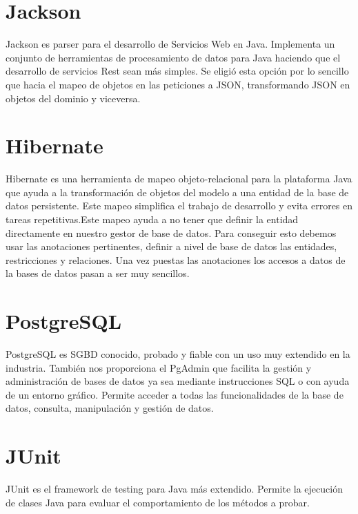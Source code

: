 \section{Jackson}

Jackson es parser para el desarrollo de Servicios Web en Java. Implementa un conjunto de   herramientas de procesamiento de datos para Java haciendo que el desarrollo de servicios Rest sean más simples. Se eligió esta opción por lo sencillo que hacia el mapeo de objetos en las peticiones a JSON, transformando  JSON en objetos del dominio y viceversa.








\section{Hibernate}
Hibernate  \cite{4} es una herramienta de mapeo objeto-relacional para la plataforma Java que ayuda a la transformación de objetos del modelo a una entidad de la base de datos persistente. Este mapeo simplifica el trabajo de desarrollo y evita errores en tareas repetitivas.Este mapeo ayuda a  no tener que definir la entidad directamente en nuestro gestor de base de datos. Para conseguir esto debemos usar las anotaciones pertinentes, definir a nivel de base de datos las entidades, restricciones y relaciones. Una vez puestas las anotaciones los accesos a datos de la  bases de datos pasan a ser muy sencillos.





\section{PostgreSQL}
PostgreSQL es SGBD conocido, probado y fiable con un uso muy extendido en la industria. También nos proporciona  el PgAdmin que facilita la gestión y administración de bases de datos ya sea mediante instrucciones SQL o con ayuda de un entorno gráfico. Permite acceder a todas las funcionalidades de la base de datos, consulta, manipulación y gestión de datos.
\section{JUnit}
JUnit es el framework de testing para Java más extendido.
Permite la ejecución de clases Java para evaluar el comportamiento de los métodos a probar.


\vspace{1cm}


